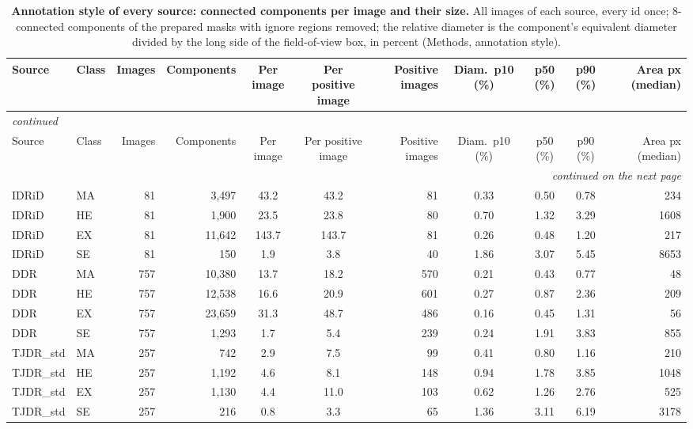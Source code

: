 
{\scriptsize\setlength{\tabcolsep}{3.2pt}\setlength{\LTcapwidth}{\textwidth}\renewcommand{\arraystretch}{1.08}
\begin{longtable}{l l r r c c r c c c r}
\caption{\textbf{Annotation style of every source: connected components per image and their size.} All images of each source, every id once; 8-connected components of the prepared masks with ignore regions removed; the relative diameter is the component's equivalent diameter divided by the long side of the field-of-view box, in percent (Methods, annotation style).}\label{stab:labels}\\
\toprule
Source & Class & Images & Components & Per image & Per positive image & Positive images & Diam.\ p10 (\%) & p50 (\%) & p90 (\%) & Area px (median) \\
\midrule
\endfirsthead
\multicolumn{11}{l}{\textit{continued}}\\
\toprule
Source & Class & Images & Components & Per image & Per positive image & Positive images & Diam.\ p10 (\%) & p50 (\%) & p90 (\%) & Area px (median) \\
\midrule
\endhead
\midrule
\multicolumn{11}{r}{\textit{continued on the next page}}\\
\endfoot
\bottomrule
\endlastfoot
IDRiD & MA & 81 & 3,497 & 43.2 & 43.2 & 81 & 0.33 & 0.50 & 0.78 & 234 \\
IDRiD & HE & 81 & 1,900 & 23.5 & 23.8 & 80 & 0.70 & 1.32 & 3.29 & 1608 \\
IDRiD & EX & 81 & 11,642 & 143.7 & 143.7 & 81 & 0.26 & 0.48 & 1.20 & 217 \\
IDRiD & SE & 81 & 150 & 1.9 & 3.8 & 40 & 1.86 & 3.07 & 5.45 & 8653 \\
DDR & MA & 757 & 10,380 & 13.7 & 18.2 & 570 & 0.21 & 0.43 & 0.77 & 48 \\
DDR & HE & 757 & 12,538 & 16.6 & 20.9 & 601 & 0.27 & 0.87 & 2.36 & 209 \\
DDR & EX & 757 & 23,659 & 31.3 & 48.7 & 486 & 0.16 & 0.45 & 1.31 & 56 \\
DDR & SE & 757 & 1,293 & 1.7 & 5.4 & 239 & 0.24 & 1.91 & 3.83 & 855 \\
TJDR\_std & MA & 257 & 742 & 2.9 & 7.5 & 99 & 0.41 & 0.80 & 1.16 & 210 \\
TJDR\_std & HE & 257 & 1,192 & 4.6 & 8.1 & 148 & 0.94 & 1.78 & 3.85 & 1048 \\
TJDR\_std & EX & 257 & 1,130 & 4.4 & 11.0 & 103 & 0.62 & 1.26 & 2.76 & 525 \\
TJDR\_std & SE & 257 & 216 & 0.8 & 3.3 & 65 & 1.36 & 3.11 & 6.19 & 3178 \\

\end{longtable}}
